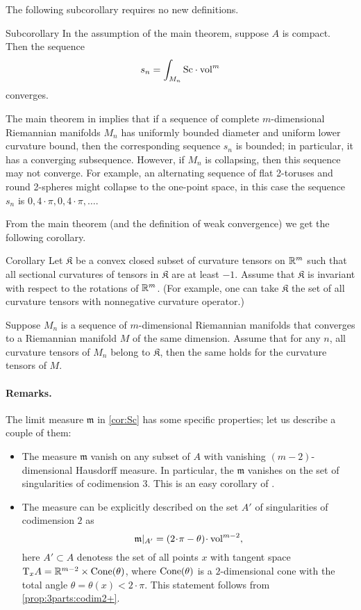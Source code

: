 The following subcorollary requires no new definitions.

\begin{thm}{Subcorollary}\label{cor:cor:Sc}
In the assumption of the main theorem, suppose $A$ is compact.
Then the sequence
\[s_n=\int_{M_n}\Sc \cdot\vol^m\]
converges.
\end{thm}

The main theorem in \cite{petrunin-SC} implies that if a sequence of complete $m$-dimensional Riemannian  manifolds $M_n$ has uniformly bounded diameter and uniform lower curvature bound, then 
the corresponding sequence $s_n$ is bounded;
in particular, it has a converging subsequence.
However, if $M_n$ is collapsing, then this sequence may not converge.
For example, an alternating sequence of flat 2-toruses and round 2-spheres might collapse to the one-point space, in this case the sequence $s_n$ is $0,4\cdot\pi,0,4\cdot\pi,\dots$.

From the main theorem (and the definition of weak convergence) we get the following corollary.

\begin{thm}{Corollary}
Let $\mathfrak{K}$ be a convex closed subset of curvature tensors on $\mathbb{R}^m$ 
such that 
all sectional curvatures of tensors in $\mathfrak{K}$ are at least $-1$.
Assume that $\mathfrak{K}$ is invariant with respect to the rotations of $\mathbb{R}^m$.
(For example, one can take $\mathfrak{K}$ the set of all curvature tensors with nonnegative curvature operator.)

Suppose $M_n$ is a sequence of $m$-dimensional Riemannian manifolds that converges to a Riemannian manifold $M$ of the same dimension.
Assume that for any $n$, all curvature tensors of $M_n$ belong to $\mathfrak{K}$, 
then the same holds for the curvature tensors of $M$.
\end{thm}



\paragraph{Remarks.}
The limit measure $\mathfrak m$ in \ref{cor:Sc} has some specific properties;
let us describe a couple of them:
\begin{itemize}
\item The measure $\mathfrak m$ vanish on any subset of $A$ with vanishing $(m-2)$-dimensional Hausdorff measure.
In particular, the $\mathfrak m$ vanishes on the set of singularities of codimension 3.
This is an easy corollary of \cite{petrunin-SC}.

\item The measure can be explicitly described on the set $A'$ of singularities
of codimension $2$ as 
$$\mathfrak m|_{A'}=(2\cdot \pi-\theta)\cdot \vol^{m-2},$$
here $A'\subset A$
denotess the set of all points $x$ with tangent space
$\T_xA\zz=\R^{m-2}\zz\times \Cone(\theta)$,
where $\operatorname{Cone}(\theta)$ is a $2$-dimensional cone
with the total angle $\theta=\theta(x)<2\cdot\pi$.
This statement follows from \ref{prop:3parts:codim2+}.
\end{itemize}


